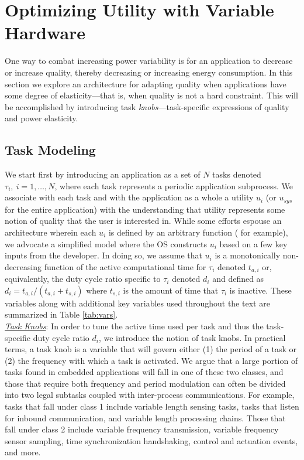 \section{Optimizing Utility with Variable Hardware}
\label{sec:optimization}

One way to combat increasing power variability is for an application to decrease or increase quality, thereby decreasing or increasing energy consumption.  In this section we explore an architecture for adapting quality when applications have some degree of elasticity---that is, when quality is not a hard constraint.   This will be accomplished by introducing task \emph{knobs}---task-specific expressions of quality and power elasticity. 

\subsection{Task Modeling}
We start first by introducing an application as a set of $N$ {tasks} denoted $\tau_i,~i = 1,\ldots,N$, where each task represents a periodic application subprocess.  We associate with each task and with the application as a whole a utility $u_i$ (or $u_{sys}$ for the entire application) with the understanding that utility represents some notion of quality that the user is interested in. 
While some efforts espouse an architecture wherein each $u_i$ is defined by an arbitrary function (\cite{green2010} for example), we advocate a simplified model where the OS constructs $u_i$ based on a few key inputs from the developer.  In doing so, we assume that $u_i$ is a monotonically non-decreasing function of the active computational time for $\tau_i$ denoted $t_{a,i}$ or, equivalently, the duty cycle ratio specific to $\tau_i$ denoted $d_i$ and defined as $d_i = t_{a,i}/(t_{a,i} + t_{s,i})$ where $t_{s,i}$ is the amount of time that $\tau_i$ is inactive. These variables along with additional key variables used throughout the text are summarized in Table \ref{tab:vars}.\\

\noindent\emph{\underline{Task Knobs}}: 
In order to tune the active time used per task and thus the task-specific duty cycle ratio $d_i$, we introduce the notion of task knobs.  In practical terms, a task knob is a variable that will govern either (1) the period of a task or (2) the frequency with which a task is activated. We argue that a large portion of tasks found in embedded applications will fall in one of these two classes, and those that require both frequency and period modulation can often be divided into two legal subtasks coupled with inter-process communications. For example, tasks that fall under class 1 include variable length sensing tasks, tasks that listen for inbound communication, and variable length processing chains.  Those that fall under class 2 include variable frequency transmission, variable frequency sensor sampling, time synchronization handshaking, control and actuation events, and more.  

